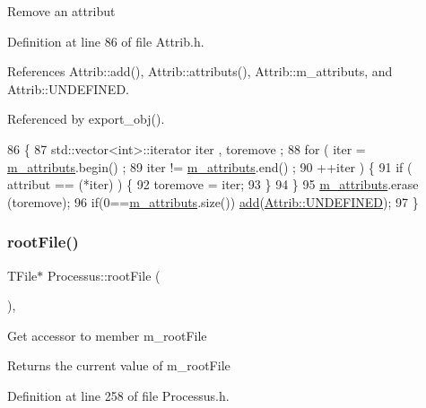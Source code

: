 Remove an attribut 

Definition at line 86 of file Attrib.\+h.



References Attrib\+::add(), Attrib\+::attributs(), Attrib\+::m\+\_\+attributs, and Attrib\+::\+U\+N\+D\+E\+F\+I\+N\+ED.



Referenced by export\+\_\+obj().


\begin{DoxyCode}
86                                \{
87     std::vector<int>::iterator iter , toremove ;
88     \textcolor{keywordflow}{for} ( iter  = \hyperlink{classAttrib_ac4bd58a0cc6b38a3b711d609a3d3aacc}{m\_attributs}.begin() ;
89           iter != \hyperlink{classAttrib_ac4bd58a0cc6b38a3b711d609a3d3aacc}{m\_attributs}.end()   ;
90           ++iter ) \{
91       \textcolor{keywordflow}{if} ( attribut == (*iter) ) \{
92         toremove = iter;
93       \}
94     \}
95     \hyperlink{classAttrib_ac4bd58a0cc6b38a3b711d609a3d3aacc}{m\_attributs}.erase (toremove);
96     \textcolor{keywordflow}{if}(0==\hyperlink{classAttrib_ac4bd58a0cc6b38a3b711d609a3d3aacc}{m\_attributs}.size()) \hyperlink{classAttrib_a235f773af19c900264a190b00a3b4ad7}{add}(\hyperlink{classAttrib_a69e171d7cc6417835a5a306d3c764235a3a8da2ab97dda18aebab196fe4100531}{Attrib::UNDEFINED});
97   \}
\end{DoxyCode}
\mbox{\label{classProcessus_a247e8c362ec08422cf53d08dd23b093c}} 
\subsubsection{\texorpdfstring{root\+File()}{rootFile()}}
{\footnotesize\ttfamily T\+File$\ast$ Processus\+::root\+File (\begin{DoxyParamCaption}{ }\end{DoxyParamCaption})\hspace{0.3cm}{\ttfamily [inline]}, {\ttfamily [inherited]}}

Get accessor to member m\+\_\+root\+File \begin{DoxyReturn}{Returns}
the current value of m\+\_\+root\+File 
\end{DoxyReturn}


Definition at line 258 of file Processus.\+h.


